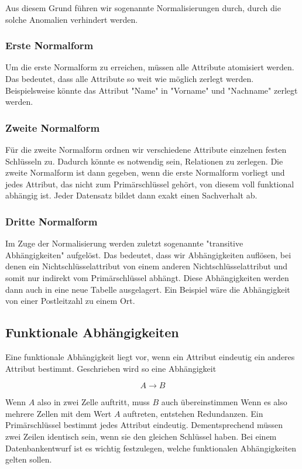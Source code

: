 \documentclass{article}
\begin{document}
	Aus diesem Grund führen wir sogenannte Normalisierungen durch, durch die solche Anomalien verhindert werden.

	\subsubsection{Erste Normalform}
	Um die erste Normalform zu erreichen, müssen alle Attribute atomisiert werden. Das bedeutet, dass alle Attribute so weit wie möglich zerlegt werden.
	Beispielsweise könnte das Attribut "Name" in "Vorname" und "Nachname" zerlegt werden.

	\subsubsection{Zweite Normalform}
	Für die zweite Normalform ordnen wir verschiedene Attribute einzelnen festen Schlüsseln zu. Dadurch könnte es notwendig sein, Relationen zu zerlegen. Die zweite Normalform ist dann gegeben, wenn die erste Normalform vorliegt und jedes Attribut, das nicht zum Primärschlüssel gehört, von diesem voll funktional abhängig ist. Jeder Datensatz bildet dann exakt einen Sachverhalt ab.

	\subsubsection{Dritte Normalform}
	Im Zuge der Normalisierung werden zuletzt sogenannte "transitive Abhängigkeiten" aufgelöst. Das bedeutet, dass wir Abhängigkeiten auflösen, bei denen ein Nichtschlüsselattribut von einem anderen Nichtschlüsselattribut und somit nur indirekt vom Primärschlüssel abhängt. Diese Abhängigkeiten werden dann auch in eine neue Tabelle ausgelagert. Ein Beispiel wäre die Abhängigkeit von einer Postleitzahl zu einem Ort.

	\subsection{Funktionale Abhängigkeiten}
	Eine funktionale Abhängigkeit liegt vor, wenn ein Attribut eindeutig ein anderes Attribut bestimmt. Geschrieben wird so eine Abhängigkeit

	\begin{equation*}
		A \rightarrow B
	\end{equation*}

	Wenn $A$ also in zwei Zelle auftritt, muss $B$ auch übereinstimmen
	Wenn es also mehrere Zellen mit dem Wert $A$ auftreten, entstehen Redundanzen. Ein Primärschlüssel bestimmt jedes Attribut eindeutig. Dementsprechend müssen zwei Zeilen identisch sein, wenn sie den gleichen Schlüssel haben. Bei einem Datenbankentwurf ist es wichtig festzulegen, welche funktionalen Abhängigkeiten gelten sollen.
\end{document}
